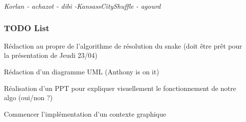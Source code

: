 {\itshape Korlan -\/ achazot -\/ dibi -\/\-Kansass\-City\-Shuffle -\/ agourd}

\subsubsection*{T\-O\-D\-O List}


\begin{DoxyEnumerate}
\item Rédaction au propre de l'algorithme de résolution du snake (doit être prêt pour la présentation de Jeudi 23/04)
\item Rédaction d'un diagramme U\-M\-L (Anthony is on it)
\item Réalisation d'un P\-P\-T pour expliquer visuellement le fonctionnement de notre algo (oui/non ?)
\item Commencer l'implémentation d'un contexte graphique 
\end{DoxyEnumerate}